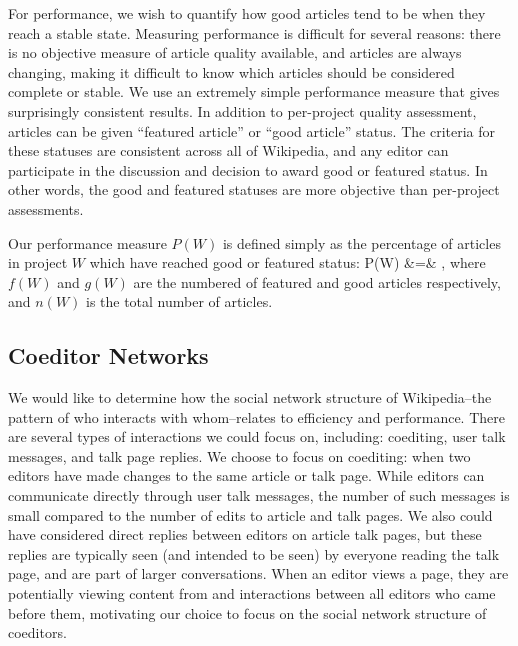 For performance, we wish to quantify how good articles tend to be when they reach a stable state.
Measuring performance is difficult for several reasons:
there is no objective measure of article quality available,
and articles are always changing, making it difficult to know which articles should be considered
complete or stable.
We use an extremely simple performance measure that gives surprisingly consistent results.
In addition to per-project quality assessment, articles can be given ``featured article'' or
``good article'' status.
The criteria for these statuses are consistent across all of Wikipedia,
and any editor can participate in the discussion and decision to award good or featured
status.
In other words, the good and featured statuses are more objective than per-project assessments.

Our performance measure $P(W)$ is defined simply as
the percentage of articles in project $W$ which have reached
good or featured status:
\beq
P(W) &=& ,
\eeq
where $f(W)$ and $g(W)$ are the numbered of featured and good articles respectively,
and $n(W)$ is the total number of articles.

\subsection{Coeditor Networks}

We would like to determine how the social network structure of
Wikipedia--the pattern of who interacts with whom--relates to
efficiency and performance.
There are several types of interactions we could focus on,
including:
coediting, user talk messages, and talk page replies.
We choose to focus on coediting: when two editors have made changes to the
same article or talk page.
While editors can communicate directly through user talk messages,
the number of such messages is small compared to the number of edits to article
and talk pages.
We also could have considered direct replies between editors on article talk
pages, but these replies are typically seen (and intended to be seen)
by everyone reading the talk page,
and are part of larger conversations.
When an editor views a page,
they are potentially viewing content from and interactions
between all editors who came before them,
motivating our choice to focus on the social network structure of
coeditors.

